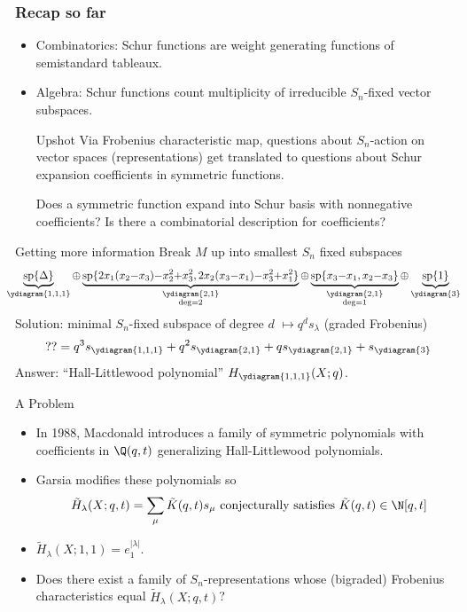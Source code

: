 \documentclass{beamer}
\renewcommand{\Span}{\operatorname{sp}}
\newcounter{c}
\begin{document}
\begin{frame}
 \frametitle{Recap so far} 
 \begin{itemize}
 \item Combinatorics: Schur functions are weight generating functions
   of semistandard tableaux.\pause
 \item Algebra: Schur functions count multiplicity of irreducible
   \(S_n\)-fixed vector subspaces.\pause
  \begin{block}{Upshot}
    Via Frobenius characteristic map, questions about
      \(S_n\)-action on vector spaces (representations) get translated to questions
      about Schur expansion coefficients in symmetric functions.
  \end{block}\pause
  Does a symmetric function expand into Schur basis with nonnegative
  coefficients?
  Is there a combinatorial description for coefficients?
 \end{itemize}
\end{frame}
\begin{frame}{Getting more information}
  \pause
  Break \(M\) up into smallest \(S_n\) fixed subspaces 
  \[
    \hspace{-0.75em}
    \scalebox{0.95}{\(
      \underbrace{\Span\{\Delta\}}_{\ydiagram{1,1,1}} {\oplus} \underbrace{\Span\{2x_1(x_2{-}x_3){-}x_2^2{+}x_3^2,
        2x_2(x_3{-}x_1){-}x_3^2{+}x_1^2\}}_{\substack{\ydiagram{2,1}\\\deg
        = 2}} {\oplus}
      \underbrace{\Span\{x_3{-}x_1, x_2{-}x_3\}}_{\substack{\ydiagram{2,1}\\\deg=1}} {\oplus} \underbrace{\Span\{1\}}_{\ydiagram{3}}\)}
  \]
  \pause
  Solution: minimal \(S_n\)-fixed subspace of degree \(d\) \(\mapsto q^d
  s_\lambda\) (graded Frobenius)\[
    ?? = q^3 s_{\ydiagram{1,1,1}} + q^2 s_{\ydiagram{2,1}} + q
    s_{\ydiagram{2,1}} + s_{\ydiagram{3}}
  \]\pause
  Answer: ``Hall-Littlewood polynomial'' \(H_{\ydiagram{1,1,1}}(X;q)\).
\end{frame}
\begin{frame}{A Problem}
  \begin{itemize}
  \item In 1988, Macdonald introduces a family of symmetric
    polynomials with coefficients in \(\Q(q,t)\) generalizing
    Hall-Littlewood polynomials.\pause
  \item Garsia modifies these polynomials so 
    \[
      \tilde{H}_\lambda(X;q,t) = \sum_\mu \tilde{K}(q,t) s_\mu \text{
        conjecturally satisfies }\tilde{K}(q,t) \in \N[q,t]
    \]\pause
  \item \(\tilde{H}_\lambda(X;1,1) = e_1^{|\lambda|}\).\pause
  \item Does there
    exist a family of \(S_n\)-representations whose (bigraded)
    Frobenius characteristics equal \(\tilde{H}_\lambda(X;q,t)\)?
  \end{itemize}
\end{frame}
\end{document}
